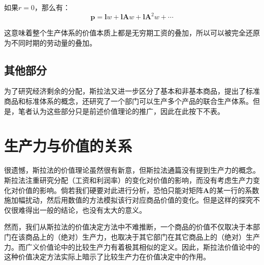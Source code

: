 如果$r=0$，那么有：
\begin{equation}
    \bm{p} = \bm{l}w + \bm{l}\bm{A}w + \bm{l}\bm{A}^2w + \cdots
\end{equation}

这意味着整个生产体系的价值本质上都是无穷期工资的叠加，所以可以被完全还原为不同时期的劳动量的叠加。

\subsection{其他部分}

为了研究经济剩余的分配，斯拉法又进一步区分了基本和非基本商品，提出了标准商品和标准体系的概念，还研究了一个部门可以生产多个产品的联合生产体系。但是，笔者认为这些部分只是前述价值理论的推广，因此在此按下不表。

\section{生产力与价值的关系}

很遗憾，斯拉法的价值理论虽然很有新意，但斯拉法通篇没有提到生产力的概念。斯拉法注重研究分配（工资和利润率）的变化对价值的影响，而没有考虑生产力变化对价值的影响。倘若我们硬要对此进行分析，恐怕只能对矩阵$\bm{A}$的某一行的系数施加幅扰动，然后用数值的方法模拟该行对应商品价值的变化。但是这样的探究不仅很难得出一般的结论，也没有太大的意义。

然而，我们从斯拉法的价值决定方法中不难推断，一个商品的价值不仅取决于本部门在该商品上的（绝对）生产力，也取决于其它部门在其它商品上的（绝对）生产力。而广义价值论中的比较生产力有着极其相似的定义。因此，斯拉法价值论中的这种价值决定方法实际上暗示了比较生产力在价值决定中的作用。